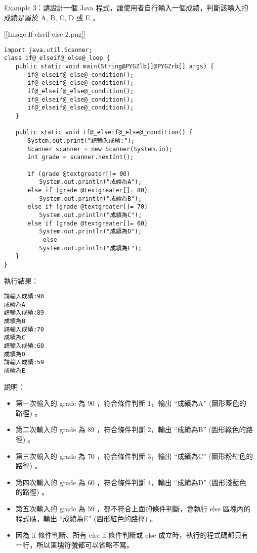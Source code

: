 \documentclass[a4paper,12pt,english]{sphinxmanual}
\begin{document}
Example 3：請設計一個 Java 程式，讓使用者自行輸入一個成績，判斷該輸入的成績是屬於 A, B, C, D 或 E 。

{[}{[}Image:If-elseif-else-2.png{]}{]}

\begin{Verbatim}[commandchars=@\[\]]
import java.util.Scanner;
class if@_elseif@_else@_loop {
　　public static void main(String@PYGZlb[]@PYGZrb[] args) {
　　　　if@_elseif@_else@_condition();
　　　　if@_elseif@_else@_condition();
　　　　if@_elseif@_else@_condition();
　　　　if@_elseif@_else@_condition();
　　　　if@_elseif@_else@_condition();
　　}

　　public static void if@_elseif@_else@_condition() {
　　　　System.out.print("請輸入成績:");
　　　　Scanner scanner = new Scanner(System.in);
　　　　int grade = scanner.nextInt();

　　　　if (grade @textgreater[]= 90)
　　　　　　System.out.println("成績為A");
　　　　else if (grade @textgreater[]= 80)
　　　　　　System.out.println("成績為B");
　　　　else if (grade @textgreater[]= 70)
　　　　　　System.out.println("成績為C");
　　　　else if (grade @textgreater[]= 60)
　　　　　　System.out.println("成績為D");
           else
　　　　　　System.out.println("成績為E");
　　}
}
\end{Verbatim}

執行結果：

\begin{Verbatim}[commandchars=@\[\]]
請輸入成績:90
成績為A
請輸入成績:89
成績為B
請輸入成績:70
成績為C
請輸入成績:60
成績為D
請輸入成績:59
成績為E
\end{Verbatim}

說明：
\begin{itemize}
\item {} 
第一次輸入的 grade 為 90 ，符合條件判斷 1，輸出 ``成績為A'' (圖形藍色的路徑) 。

\item {} 
第二次輸入的 grade 為 89 ，符合條件判斷 2，輸出 ``成績為B'' (圖形綠色的路徑) 。

\item {} 
第三次輸入的 grade 為 70 ，符合條件判斷 3，輸出 ``成績為C'' (圖形粉紅色的路徑) 。

\item {} 
第四次輸入的 grade 為 60 ，符合條件判斷 4，輸出 ``成績為D'' (圖形淺藍色的路徑) 。

\item {} 
第五次輸入的 grade 為 59 ，都不符合上面的條件判斷，會執行 else 區塊內的程式碼，輸出 ``成績為E'' (圖形紅色的路徑) 。

\item {} 
因為 if 條件判斷、所有 else if 條件判斷或 else 成立時，執行的程式碼都只有一行，所以區塊符號都可以省略不寫。

\end{itemize}
\end{document}
